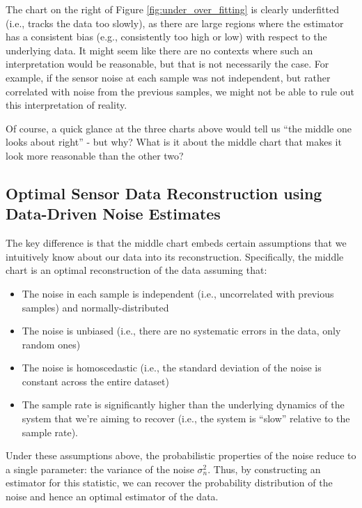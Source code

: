 \documentclass[conf]{new-aiaa}
\begin{document}
    The chart on the right of Figure \ref{fig:under_over_fitting} is clearly underfitted (i.e., tracks the data too slowly), as there are large regions where the estimator has a consistent bias (e.g., consistently too high or low) with respect to the underlying data. It might seem like there are no contexts where such an interpretation would be reasonable, but that is not necessarily the case. For example, if the sensor noise at each sample was not independent, but rather correlated with noise from the previous samples, we might not be able to rule out this interpretation of reality.

    Of course, a quick glance at the three charts above would tell us ``the middle one looks about right'' - but why? What is it about the middle chart that makes it look more reasonable than the other two?

    \subsection{Optimal Sensor Data Reconstruction using Data-Driven Noise Estimates}

    The key difference is that the middle chart embeds certain assumptions that we intuitively know about our data into its reconstruction. Specifically, the middle chart is an optimal reconstruction of the data assuming that:

    \begin{itemize}
        \item The noise in each sample is independent (i.e., uncorrelated with previous samples) and normally-distributed
        \item The noise is unbiased (i.e., there are no systematic errors in the data, only random ones)
        \item The noise is homoscedastic (i.e., the standard deviation of the noise is constant across the entire dataset)
        \item The sample rate is significantly higher than the underlying dynamics of the system that we're aiming to recover (i.e., the system is ``slow'' relative to the sample rate).
    \end{itemize}

    Under these assumptions above, the probabilistic properties of the noise reduce to a single parameter: the variance of the noise $\sigma^2_n$. Thus, by constructing an estimator for this statistic, we can recover the probability distribution of the noise and hence an optimal estimator of the data.
\end{document}
